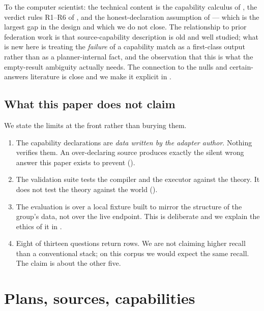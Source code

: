 \documentclass[11pt,a4paper]{article}
\theoremstyle{plain}
\theoremstyle{definition}
\theoremstyle{remark}
\begin{document}
To the computer scientist: the technical content is the capability
calculus of , the verdict rules R1--R6 of
, and the honest-declaration assumption of
 --- which is the largest gap in the design and which
we do not close. The relationship to prior federation work
\citep{Wiederhold1992,Levy1996,Haas1997,Schwarte2011,Saleem2016} is
that source-capability description is old and well studied; what is new
here is treating the \emph{failure} of a capability match as a
first-class output rather than as a planner-internal fact, and the
observation that this is what the empty-result ambiguity actually needs.
The connection to the nulls and certain-answers literature
\citep{Codd1979,Imielinski1984,Libkin2016} is close and we make it
explicit in .

\subsection{What this paper does not claim}

We state the limits at the front rather than burying them.

\begin{enumerate}[label=(\roman*),leftmargin=2.2em]
\item The capability declarations are \emph{data written by the adapter
  author}. Nothing verifies them. An over-declaring source produces
  exactly the silent wrong answer this paper exists to prevent
  ().
\item The validation suite tests the compiler and the executor against
  the theory. It does not test the theory against the world
  ().
\item The evaluation is over a local fixture built to mirror the
  structure of the group's data, not over the live endpoint. This is
  deliberate and we explain the ethics of it in .
\item Eight of thirteen questions return rows. We are not claiming
  higher recall than a conventional stack; on this corpus we would
  expect the same recall. The claim is about the other five.
\end{enumerate}

\section{Plans, sources, capabilities}
\label{sec:calculus}
\end{document}
